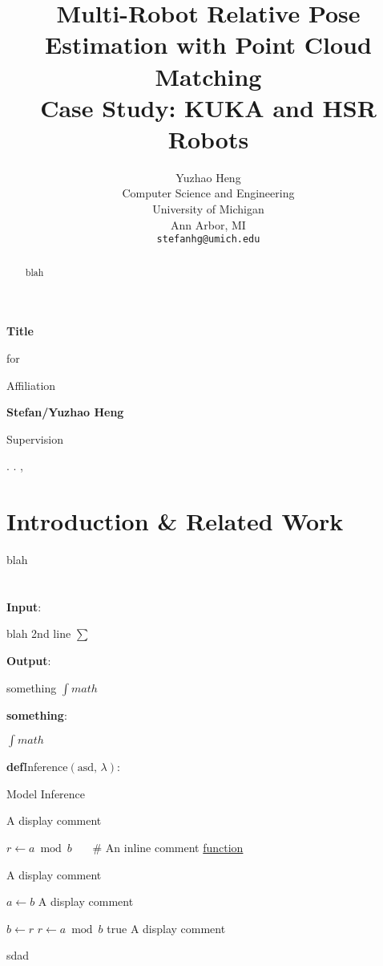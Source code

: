 \documentclass[10pt]{article}
\title{Multi-Robot Relative Pose Estimation with Point Cloud Matching \\ Case Study: KUKA and HSR Robots}
\author{
    Yuzhao Heng \\
    Computer Science and Engineering \\
    University of Michigan \\
    Ann Arbor, MI \\
    \texttt{stefanhg@umich.edu}
}
\makeatletter
\newcommand{\mydate}{\shortdayofweekname{\day}{\month}{\year}. \shortmonthname. \nth{\day}, \the\year{}}
\newcommand{\paren}[1]{\left(#1\right)}
\newcommand{\defMy}[2]{\vspace{0.25em}\textcolor{code_io}{\textbf{def}}\hspace{0.5em}#1$\displaystyle \paren{\text{#2}}$:\par\vspace{0.25em}}
\def\Com#1{{\def\alglinenumber##1{\textcolor{code_comment}{\#}}\State \textcolor{code_comment}{#1}\vspace{0.125em}}\addtocounter{ALG@line}{-1}}
\def\ComT#1{{\def\alglinenumber##1{\textcolor{code_comment}{\#}}\item \textcolor{code_comment}{#1}\vspace{0.125em}}\addtocounter{ALG@line}{-1}}
\newcommand{\comIn}[1]{\textcolor{code_comment}{~~~\# #1}}
\newcommand{\kwPair}[2]{\vspace{0.25em}\hspace{1em}\textbf{#1}: \begin{minipage}[t]{\linewidth-\widthof{\textbf{#1}-1em}}#2\end{minipage} \par \vspace{0.25em}}
\makeatother
\begin{document}
\begin{titlepage}
    \begin{center}
        \vspace*{3cm}

        \Huge
        \textbf{Title} \par
        \vspace{0.5cm}

        \LARGE
        for \par
        Affiliation
        \vspace{1.5cm}

        \textbf{Stefan/Yuzhao Heng}
        \vfill

        \large
        Supervision \par
        \vspace{0.8cm}

        \mydate \vspace{0.5cm}
        \vspace{0.8cm}
    \end{center}
\end{titlepage}
\maketitle


\thispagestyle{titlepage}
\begin{abstract}
    blah
\end{abstract}

\section{Introduction \& Related Work}
blah

\citealp{Wasik:16}


\section{}
\begin{algorithm}
    \kwPair{Input}{blah \newline 2nd line \newline $\displaystyle \sum$}
    \kwPair{Output}{something \newline $\displaystyle \int math$}
    \kwPair{something}{$\displaystyle \int math$}
    \defMy{Inference}{asd, $\lambda$}
    \caption{Model Inference}
    \begin{algorithmic}[1]
        \ComT{A display comment}
        \State $r\gets a\bmod b$ \comIn{An inline comment}
        \State \hyperref[alg:func]{function}
        \ComT{A display comment}
            \State
        \EndFor
         
            \State $a\gets b$
            \Com{A display comment}
            \State $b\gets r$
            \State $r\gets a\bmod b$ \AND true
            \Com{A display comment}
        \EndWhile\label{euclidendwhile}
        \RETURN{} sdad 
    \end{algorithmic}
\end{algorithm}
\end{document}

